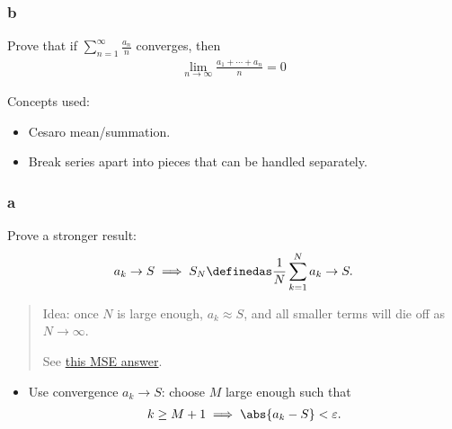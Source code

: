 \hypertarget{b}{%
\subsubsection{b}\label{b}}

Prove that if \(\displaystyle\sum_{n=1}^{\infty} \frac{a_{n}}{n}\)
converges, then
\begin{align*}
\lim _{n \rightarrow \infty} \frac{a_{1}+\cdots+a_{n}}{n}=0
\end{align*}

\begin{solution}

Concepts used:

\begin{itemize}
\tightlist
\item
  Cesaro mean/summation.
\item
  Break series apart into pieces that can be handled separately.
\end{itemize}

\hypertarget{a-1}{%
\subsubsection{a}\label{a-1}}

Prove a stronger result:
\begin{align*}
a_k \to S \implies S_N\definedas \frac 1 N \sum_{k=1}^N a_k \to S
.\end{align*}

\begin{quote}
Idea: once \(N\) is large enough, \(a_k \approx S\), and all smaller
terms will die off as \(N\to \infty\).

See
\href{https://math.stackexchange.com/questions/514802/convergence-of-series-implies-convergence-of-cesaro-mean}{this
MSE answer}.
\end{quote}

\begin{itemize}
\tightlist
\item
  Use convergence \(a_k \to S\): choose \(M\) large enough such that
  \begin{align*}
  k\geq M+1 \implies \abs{a_k - S} < \varepsilon
  .\end{align*}
\end{itemize}


\end{solution}
